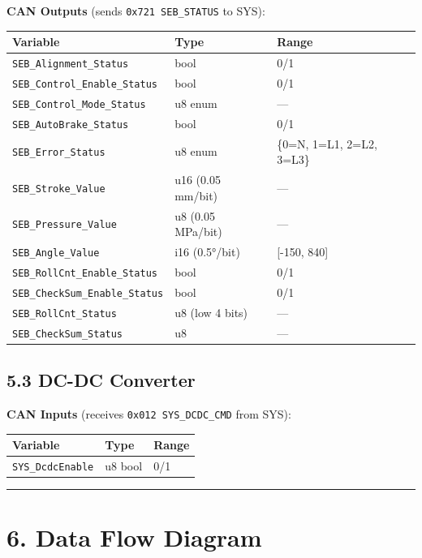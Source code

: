 \documentclass[12pt,a4paper,oneside]{report}
\begin{document}
\textbf{CAN Outputs} (sends \texttt{0x721\ SEB\_STATUS} to SYS):

\begin{longtable}[]{@{}lll@{}}
\toprule\noalign{}
Variable & Type & Range \\
\midrule\noalign{}
\endhead
\bottomrule\noalign{}
\endlastfoot
\texttt{SEB\_Alignment\_Status} & bool & 0/1 \\
\texttt{SEB\_Control\_Enable\_Status} & bool & 0/1 \\
\texttt{SEB\_Control\_Mode\_Status} & u8 enum & --- \\
\texttt{SEB\_AutoBrake\_Status} & bool & 0/1 \\
\texttt{SEB\_Error\_Status} & u8 enum & \{0=N, 1=L1, 2=L2, 3=L3\} \\
\texttt{SEB\_Stroke\_Value} & u16 (0.05 mm/bit) & --- \\
\texttt{SEB\_Pressure\_Value} & u8 (0.05 MPa/bit) & --- \\
\texttt{SEB\_Angle\_Value} & i16 (0.5°/bit) & {[}-150, 840{]} \\
\texttt{SEB\_RollCnt\_Enable\_Status} & bool & 0/1 \\
\texttt{SEB\_CheckSum\_Enable\_Status} & bool & 0/1 \\
\texttt{SEB\_RollCnt\_Status} & u8 (low 4 bits) & --- \\
\texttt{SEB\_CheckSum\_Status} & u8 & --- \\
\end{longtable}

\subsection{5.3 DC-DC Converter}\label{dc-dc-converter}

\textbf{CAN Inputs} (receives \texttt{0x012\ SYS\_DCDC\_CMD} from SYS):

\begin{longtable}[]{@{}lll@{}}
\toprule\noalign{}
Variable & Type & Range \\
\midrule\noalign{}
\endhead
\bottomrule\noalign{}
\endlastfoot
\texttt{SYS\_DcdcEnable} & u8 bool & 0/1 \\
\end{longtable}

\begin{center}\rule{0.5\linewidth}{0.5pt}\end{center}

\section{6. Data Flow Diagram}\label{data-flow-diagram}
\end{document}
